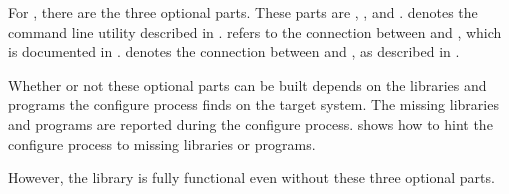 %                                                                        
%                                                                        
%                                                                        
%                                                                        
%

For \projectname, there are the three optional parts. These parts are , , and .  denotes the command line utility described in .  refers to the connection between \Maple and \projectname, which is documented in .  denotes the connection between \Mathematica and \projectname, as described in .

Whether or not these optional parts can be built depends on the libraries and programs the configure process finds on the target system. The missing libraries and programs are reported during the configure process.  shows how to hint the configure process to missing libraries or programs.

However, the \projectname \Aldor library is fully functional even without these three optional parts.